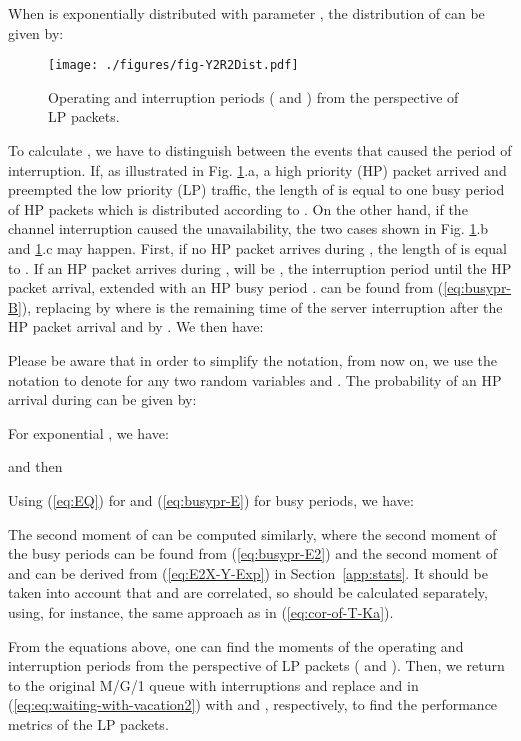\documentclass[11pt,journal,oneside,onecolumn,draftclsnofoot]{IEEEtran}
\begin{document}
When  is exponentially distributed with parameter , the distribution of  can be given by: 

\begin{figure}\texttt{[image: ./figures/fig-Y2R2Dist.pdf]}\caption{Operating and interruption periods ( and ) from the perspective of LP packets.}\label{fig-Y2R2Dist}\end{figure}
To calculate , we have to distinguish between the events that caused the period of interruption.
If, as illustrated in Fig. \ref{fig-Y2R2Dist}.a, a high priority (HP) packet arrived and preempted the low priority (LP) traffic, the length of  is equal to one busy period of HP packets which is distributed according to . On the other hand, if the channel interruption caused the unavailability, the two cases  shown in Fig. \ref{fig-Y2R2Dist}.b and \ref{fig-Y2R2Dist}.c may happen. First, if no HP packet arrives during , the length of  is equal to . If an HP packet arrives during ,  will be , the interruption period until the HP packet arrival, extended with an HP busy period .  can be found from (\ref{eq:busypr-B}), replacing  by  where  is the remaining time of the server interruption after the HP packet arrival and  by . We then have:

Please be aware that in order to simplify the notation, from now on, we use the notation   to denote  for any two random variables  and .
The probability of an HP arrival during   can be given by:

For exponential , we have:

and then

Using (\ref{eq:EQ}) for  and (\ref{eq:busypr-E}) for busy periods, we have:


The second moment of  can be computed similarly, where the second moment of the busy periods can be found from (\ref{eq:busypr-E2}) and the second moment of  and  can be derived from (\ref{eq:E2X-Y-Exp}) in Section~\ref{app:stats}. It should be taken into account that  and  are correlated, so  should be calculated separately, using, for instance, the same approach as in (\ref{eq:cor-of-T-Ka}). 



From the equations above, one can find the moments of the operating and interruption periods from the perspective of LP packets ( and ). Then, we return to the original M/G/1 queue with interruptions and replace  and  in (\ref{eq:eq:waiting-with-vacation2}) with  and , respectively, to find the performance metrics of the LP packets. 
\end{document}

